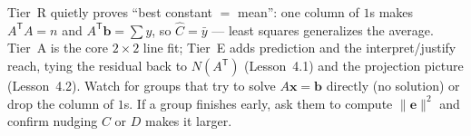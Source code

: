 \documentclass[10pt]{article}
\newcommand{\xx}{\mathbf{x}}
\newcommand{\bb}{\mathbf{b}}
\newcommand{\ee}{\mathbf{e}}
\newcommand{\T}{\mathsf{T}}
\begin{document}
\begin{teachernote}
Tier~R quietly proves ``best constant $=$ mean'': one column of $1$s makes $A^{\T}A=n$ and
$A^{\T}\bb=\sum y$, so $\hat{C}=\bar y$ --- least squares generalizes the average. Tier~A is the core
$2\times2$ line fit; Tier~E adds prediction and the interpret/justify reach, tying the residual back to
$N(A^{\T})$ (Lesson~4.1) and the projection picture (Lesson~4.2). Watch for groups that try to solve
$A\xx=\bb$ directly (no solution) or drop the column of $1$s. If a group finishes early, ask them to
compute $\|\ee\|^2$ and confirm nudging $C$ or $D$ makes it larger.
\end{teachernote}
\end{document}

